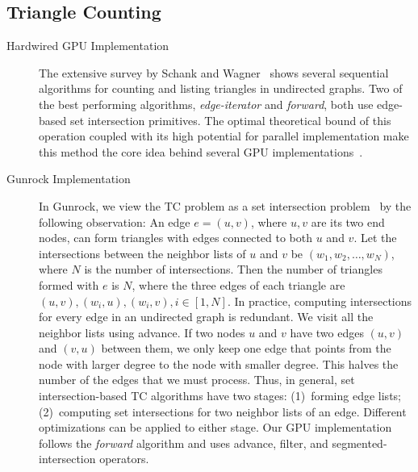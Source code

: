 \documentclass[format=acmsmall,review=false,screen=true]{acmart}
\begin{document}
\subsection{Triangle Counting}
\begin{description}
\item[Hardwired GPU Implementation] The extensive survey by Schank and
  Wagner~ shows several sequential
  algorithms for counting and listing triangles in undirected graphs.
  Two of the best performing algorithms, \emph{edge-iterator} and
  \emph{forward}, both use edge-based set intersection primitives. The
  optimal theoretical bound of this operation coupled with its high
  potential for parallel implementation make this method the core idea
  behind several GPU
  implementations~\cite{Green:2014:FTC,Polak:2015:CTL}.
\item[Gunrock Implementation] In Gunrock, we view the TC problem as a
  set intersection problem~\cite{Wang:2016:ACS} by the following
  observation: An edge $e=(u,v)$, where $u,v$ are its two end nodes,
  can form triangles with edges connected to both $u$ and $v$. Let the
  intersections between the neighbor lists of $u$ and $v$ be
  $(w_1, w_2, \ldots, w_N)$, where $N$ is the number of intersections.
  Then the number of triangles formed with $e$ is $N$, where the three
  edges of each triangle are
  $(u, v), (w_i, u), (w_i, v), i \in [1,N]$. In practice, computing
  intersections for every edge in an undirected graph is redundant. We
  visit all the neighbor lists using advance. If two nodes $u$ and $v$
  have two edges $(u,v)$ and $(v,u)$ between them, we only keep one
  edge that points from the node with larger degree to the node with
  smaller degree. This halves the number of the edges that we must
  process. Thus, in general, set intersection-based TC algorithms have
  two stages: (1)~forming edge lists; (2)~computing set intersections
  for two neighbor lists of an edge. Different optimizations can be
  applied to either stage. Our GPU implementation follows the
  \emph{forward} algorithm and uses advance, filter, and
  segmented-intersection operators.
\end{description}
\end{document}
